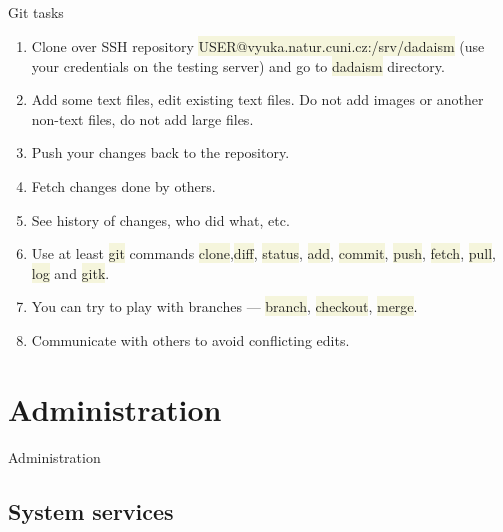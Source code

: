 \documentclass[compress, xelatex, 11pt, xcolor=svgnames, aspectratio=169,
	hyperref={
		bookmarks=true,
		unicode=true,
		colorlinks=true,
		pdftitle={Linux, command line and MetaCentrum},
		plainpages=false,
		pdfauthor={Vojtech Zeisek},
		pdfsubject={Course about use of Linux command line, writing shell scripts and using MetaCentrum of CESNET},
		pdfcreator={XeLaTeX},
		pdfkeywords={Linux, GNU, BASH, shell, command line, MetaCentrum},
		linkcolor=DarkRed, %
		anchorcolor=DarkBlue, %
		citecolor=Indigo, %
		filecolor=NavyBlue, %
		menucolor=DarkMagenta, %
		urlcolor=DarkBlue, %
		},
	url={hyphens, lowtilde} %
	]{beamer}
\renewcommand{\texttt}[1]{\colorbox{Beige}{{\ttfamily #1}}}
\begin{document}
\subsection{}

\begin{frame}{Git tasks}
	\begin{enumerate}
		\item Clone over SSH repository \texttt{USER@vyuka.natur.cuni.cz:/srv/dadaism} (use your credentials on the testing server) and go to \texttt{dadaism} directory.
		\item Add some text files, edit existing text files. Do not add images or another non-text files, do not add large files.
		\item Push your changes back to the repository.
		\item Fetch changes done by others.
		\item See history of changes, who did what, etc.
		\item Use at least \texttt{git} commands \texttt{clone},\texttt{diff}, \texttt{status}, \texttt{add}, \texttt{commit}, \texttt{push}, \texttt{fetch}, \texttt{pull}, \texttt{log} and \texttt{gitk}.
		\item You can try to play with branches --- \texttt{branch}, \texttt{checkout}, \texttt{merge}.
		\item Communicate with others to avoid conflicting edits.
	\end{enumerate}
\end{frame}

\section{Administration}

\begin{frame}{Administration}
	\tableofcontents[currentsection, sectionstyle=show/hide, hideothersubsections]
\end{frame}

\subsection{System services}
\end{document}
